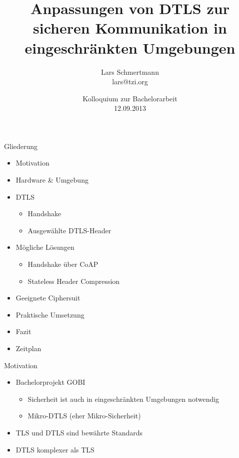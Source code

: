 \documentclass{beamer}
\title[Anpassungen von DTLS]%
{%
  Anpassungen von DTLS zur sicheren Kommunikation in eingeschränkten Umgebungen
}
\author[Lars Schmertmann]%
{
{Lars Schmertmann}\\
\vspace{.2cm}
{\scriptsize lars@tzi.org}
}
\institute{TZI, Universit\"{a}t Bremen, Deutschland}
\date[09.2013]%
{{Kolloquium zur Bachelorarbeit\\
12.09.2013}}%
\begin{document}

\begin{frame}
  \titlepage
\end{frame}

\begin{frame}{Gliederung}
  \begin{itemize}
    \item Motivation
    \item Hardware \& Umgebung
    \item DTLS
      \begin{itemize}
        \item Handshake
        \item Ausgewählte DTLS-Header
      \end{itemize}
    \item Mögliche Lösungen
    \begin{itemize}
      \item Handshake über CoAP
      \item Stateless Header Compression
    \end{itemize}
    \item Geeignete Ciphersuit
    \item Praktische Umsetzung
    \item Fazit
    \item Zeitplan
  \end{itemize}
\end{frame}

\begin{frame}{Motivation}
  \begin{itemize}
    \item Bachelorprojekt GOBI
    \begin{itemize}
      \item Sicherheit ist auch in eingeschränkten \newline Umgebungen notwendig
      \item Mikro-DTLS (eher Mikro-Sicherheit)
    \end{itemize}
    \item TLS und DTLS sind bewährte Standards
    \item DTLS komplexer als TLS
  \end{itemize}
\end{frame}
\end{document}
